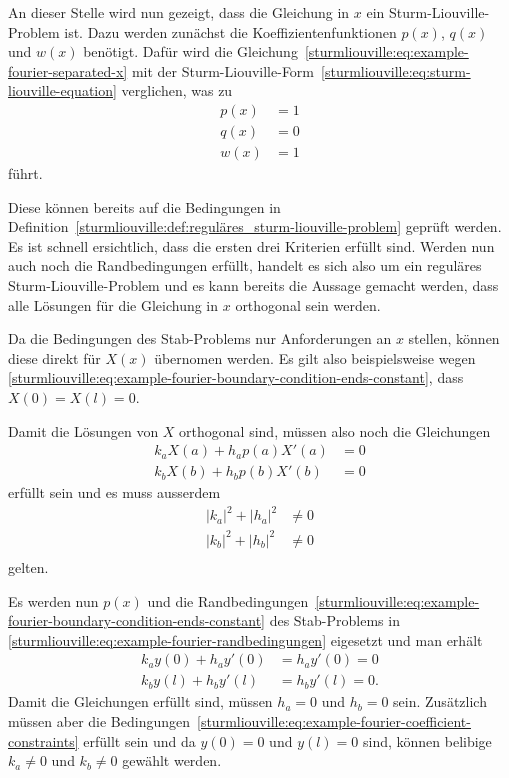%
%

An dieser Stelle wird nun gezeigt, dass die Gleichung in $x$ ein
Sturm-Liouville-Problem ist.
Dazu werden zunächst die Koeffizientenfunktionen $p(x)$, $q(x)$ und $w(x)$
benötigt.
Dafür wird die Gleichung~\eqref{sturmliouville:eq:example-fourier-separated-x}
mit der
Sturm-Liouville-Form~\eqref{sturmliouville:eq:sturm-liouville-equation}
verglichen, was zu 
\[
\begin{aligned} 
    p(x) &= 1 \\
    q(x) &= 0 \\
    w(x) &= 1
\end{aligned}
\]
führt.

Diese können bereits auf die Bedingungen in
Definition~\ref{sturmliouville:def:reguläres_sturm-liouville-problem} geprüft
werden.
Es ist schnell ersichtlich, dass die ersten drei Kriterien erfüllt sind.
Werden nun auch noch die Randbedingungen erfüllt, handelt es sich also um ein
reguläres Sturm-Liouville-Problem und es kann bereits die Aussage gemacht
werden, dass alle Lösungen für die Gleichung in $x$ orthogonal sein werden.

Da die Bedingungen des Stab-Problems nur Anforderungen an $x$ stellen, können
diese direkt für $X(x)$ übernomen werden.
Es gilt also beispielsweise wegen
\eqref{sturmliouville:eq:example-fourier-boundary-condition-ends-constant},
dass $X(0) = X(l) = 0$.

Damit die Lösungen von $X$ orthogonal sind, müssen also noch die Gleichungen
\begin{equation}
\begin{aligned}
	\label{sturmliouville:eq:example-fourier-randbedingungen}
	k_a X(a) + h_a p(a) X'(a) &= 0 \\
	k_b X(b) + h_b p(b) X'(b) &= 0
\end{aligned}
\end{equation}
erfüllt sein und es muss ausserdem
\begin{equation}
\begin{aligned}
    \label{sturmliouville:eq:example-fourier-coefficient-constraints}
    |k_a|^2 + |h_a|^2 &\neq 0\\
    |k_b|^2 + |h_b|^2 &\neq 0\\
\end{aligned}
\end{equation}
gelten.

Es werden nun $p(x)$ und die 
Randbedingungen~\eqref{sturmliouville:eq:example-fourier-boundary-condition-ends-constant}
des Stab-Problems in \eqref{sturmliouville:eq:example-fourier-randbedingungen}
eigesetzt und man erhält
\[
\begin{aligned}
	k_a y(0) + h_a y'(0) &= h_a y'(0) = 0 \\
	k_b y(l) + h_b y'(l) &= h_b y'(l) = 0.
\end{aligned}
\]
Damit die Gleichungen erfüllt sind, müssen $h_a = 0$ und $h_b = 0$ sein.
Zusätzlich müssen aber die 
Bedingungen~\eqref{sturmliouville:eq:example-fourier-coefficient-constraints}
erfüllt sein und da $y(0) = 0$ und $y(l) = 0$ sind, können belibige $k_a \neq 0$
und $k_b \neq 0$ gewählt werden.

